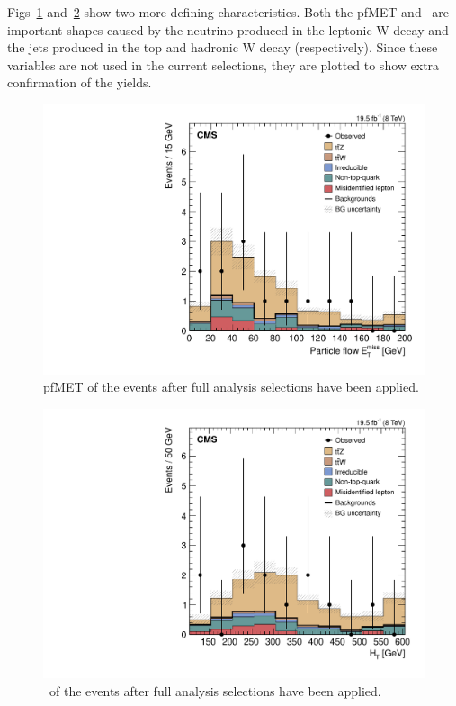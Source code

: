 Figs~\ref{fig:hpfMET_3l2j2b} and~\ref{fig:hHt_3l2j2b} show two more defining characteristics. Both the pfMET and \HT \ are important shapes caused by the neutrino produced in the leptonic W decay and the jets produced in the top and hadronic W decay (respectively). Since these variables are not used in the current selections, they are plotted to show extra confirmation of the yields.

\begin{figure}[h]
\begin{center}
\includegraphics[width=0.48\linewidth]{Figs/Plots_Final_Selections/hpfMET_3L2J2b.pdf}
\caption{\label{fig:hpfMET_3l2j2b}
pfMET of the events after full analysis selections have been applied.
}
\end{center}
\end{figure} 

\begin{figure}[h]
\begin{center}
\includegraphics[width=0.48\linewidth]{Figs/Plots_Final_Selections/hHt_3L2J2b.pdf}
\caption{\label{fig:hHt_3l2j2b}
\HT \ of the events after full analysis selections have been applied.
}
\end{center}
\end{figure} 















	
	
